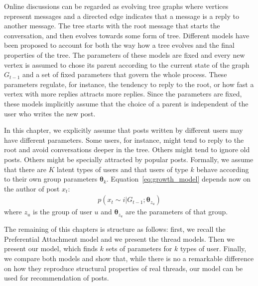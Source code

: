 \documentclass[smallextended]{svjour3}          %
\begin{document}
Online discussions can be regarded as evolving tree graphs where vertices represent messages and a directed edge indicates that a message is a reply to another message. The tree starts with the root message that starts the conversation, and then evolves towards some form of tree. Different models have been proposed to account for both the way how a tree evolves and the final properties of the tree. The parameters of these models are fixed and every new vertex is assumed to chose its parent according to the current state of the graph $G_{t-1}$ and a set of fixed parameters that govern the whole process. These parameters regulate, for instance, the tendency to reply to the root, or how fast a vertex with more replies attracts more replies.  Since the parameters are fixed, these models implicitly assume that the choice of a parent is independent of the user who writes the new post.

In this chapter, we explicitly assume that posts written by different users may have different parameters. Some users, for instance, might tend to reply to the root and avoid conversations deeper in the tree. Others might tend to ignore old posts. Others might be specially attracted by popular posts. Formally, we assume that there are $K$ latent types of users and that users of type $k$ behave according to their own group parameters $\boldsymbol{\theta}_k$.  Equation~\ref{eq:growth_model} depends now on the author of post $x_t$:
\begin{align*}
p(x_t \sim i | G_{t-1}; \boldsymbol{\theta}_{z_u})
\end{align*}
where $z_u$ is the group of user $u$ and  $\boldsymbol{\theta}_{z_u}$ are the parameters of that group.

The remaining of this chapters is structure as follows: first, we recall the Preferential Attachment model and we present the thread models. Then we present our model, which finds $k$ sets of parameters for $k$ types of user. Finally, we compare both models and show that, while there is no a remarkable difference on how they reproduce structural properties of real threads, our model can be used for recommendation of posts. 
\end{document}
